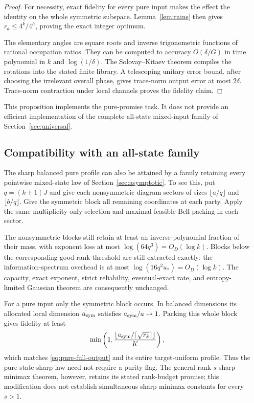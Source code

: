 \begin{proof}
For necessity, exact fidelity for every pure input makes the effect the identity on the whole symmetric subspace. Lemma~\ref{lem:rains} then gives $r_k\le4^k/4^h$, proving the exact integer optimum.

The elementary angles are square roots and inverse trigonometric functions of rational occupation ratios. They can be computed to accuracy $O(\delta/G)$ in time polynomial in $k$ and $\log(1/\delta)$. The Solovay--Kitaev theorem \cite{dawson} compiles the rotations into the stated finite library. A telescoping unitary error bound, after choosing the irrelevant overall phase, gives trace-norm output error at most $2\delta$. Trace-norm contraction under local channels proves the fidelity claim.
\end{proof}

This proposition implements the pure-promise task. It does not provide an efficient implementation of the complete all-state mixed-input family of Section~\ref{sec:universal}.

\subsection{Compatibility with an all-state family}
The sharp balanced pure profile can also be attained by a family retaining every pointwise mixed-state law of Section~\ref{sec:asymptotic}. To see this, put $q=(k+1)J$ and give each nonsymmetric diagram sectors of sizes $\lfloor a/q\rfloor$ and $\lfloor b/q\rfloor$. Give the symmetric block all remaining coordinates at each party. Apply the same multiplicity-only selection and maximal feasible Bell packing in each sector.

The nonsymmetric blocks still retain at least an inverse-polynomial fraction of their mass, with exponent loss at most $\log(64q^3)=O_D(\log k)$. Blocks below the corresponding good-rank threshold are still extracted exactly; the information-spectrum overhead is at most $\log(16q^2u_*)=O_D(\log k)$. The capacity, exact exponent, strict reliability, eventual-exact rate, and entropy-limited Gaussian theorem are consequently unchanged.

For a pure input only the symmetric block occurs. In balanced dimensions its allocated local dimension $a_{\rm sym}$ satisfies $a_{\rm sym}/a\to1$. Packing this whole block gives fidelity at least
\[
 \min\left(1,\frac{\lfloor a_{\rm sym}/\lceil\sqrt{r_k}\rceil\rfloor}{K}\right),
\]
which matches \eqref{eq:pure-full-output} and its entire target-uniform profile. Thus the pure-state sharp law need not require a purity flag. The general rank-$s$ sharp minimax theorem, however, retains its stated rank-budget promise; this modification does not establish simultaneous sharp minimax constants for every $s>1$.
